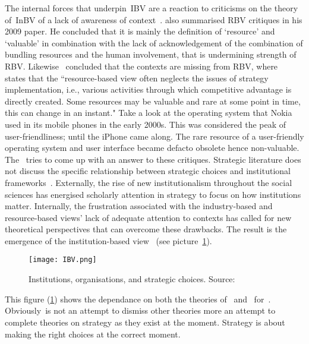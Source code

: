 The internal forces that underpin~\gls{IBV} are a reaction to criticisms on the theory of~\gls{InBV} of a lack of awareness of context~\cite{Narayanan:2005}. 
\cite{Kraaijenbrink:2009} also summarised \gls{RBV} critiques in his 2009 paper. 
He concluded that it is mainly the definition of `resource' and `valuable' in combination with the lack of acknowledgement of the combination of bundling resources and the human involvement, that is undermining strength of \gls{RBV}.
Likewise~\cite{Priem:2001} concluded that the contexts are missing from \gls{RBV}, where~\cite{Dung:2012} states that the ``resource-based view often neglects the issues of strategy implementation, i.e., various activities through which competitive advantage is directly created. Some resources may be valuable and rare at some point in time, this can change in an instant." 
Take a look at the operating system that Nokia used in its mobile phones in the early 2000s. 
This was considered the peak of user-friendliness; until the iPhone came along. 
The rare resource of a user-friendly operating system and user interface became defacto obsolete hence non-valuable.\\

The \ibv~tries to come up with an answer to these critiques. 
Strategic literature does not discuss the specific relationship between strategic choices and institutional frameworks~\cite{Peng:2008}.
Externally, the rise of new institutionalism throughout the social sciences has energised scholarly attention in strategy to focus on how institutions matter. 
Internally, the frustration associated with the industry-based and resource-based views’ lack of adequate attention to contexts has called for new theoretical perspectives that can overcome these drawbacks. 
The result is the emergence of the institution-based view~\cite{Peng:2009} (see picture~\ref{fig:Peng2000}).
\begin{figure}[htbp!]
	\centering
	\texttt{[image: IBV.png]}
 	\caption{Institutions, organisations, and strategic choices. Source:~\cite{Peng:2000}}
 	\label{fig:Peng2000}
\end{figure}




This figure (\ref{fig:Peng2000}) shows the dependance on both the theories of~\cite{Barney:2001} and~\cite{Porter:1980} for~\ibv. Obviously~\ibv is not an attempt to dismiss other theories more an attempt to complete theories on strategy as they exist at the moment. Strategy is about making the right choices at the correct moment. \\


